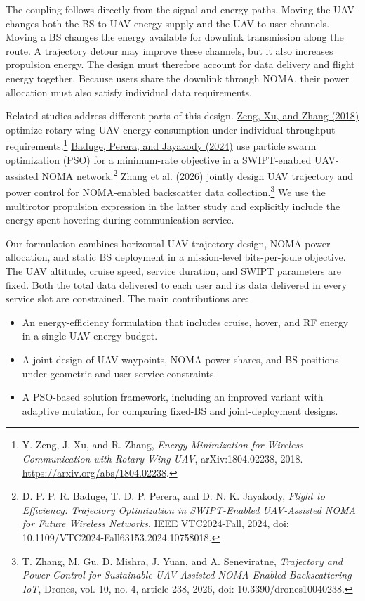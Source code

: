 The coupling follows directly from the signal and energy paths. Moving the UAV changes both the BS-to-UAV energy supply and the UAV-to-user channels. Moving a BS changes the energy available for downlink transmission along the route. A trajectory detour may improve these channels, but it also increases propulsion energy. The design must therefore account for data delivery and flight energy together. Because users share the downlink through NOMA, their power allocation must also satisfy individual data requirements.

Related studies address different parts of this design. \href{https://arxiv.org/abs/1804.02238}{Zeng, Xu, and Zhang (2018)} optimize rotary-wing UAV energy consumption under individual throughput requirements.\footnote{Y. Zeng, J. Xu, and R. Zhang, \emph{Energy Minimization for Wireless Communication with Rotary-Wing UAV}, arXiv:1804.02238, 2018. \url{https://arxiv.org/abs/1804.02238}.} \href{https://doi.org/10.1109/VTC2024-Fall63153.2024.10758018}{Baduge, Perera, and Jayakody (2024)} use particle swarm optimization (PSO) for a minimum-rate objective in a SWIPT-enabled UAV-assisted NOMA network.\footnote{D. P. P. R. Baduge, T. D. P. Perera, and D. N. K. Jayakody, \emph{Flight to Efficiency: Trajectory Optimization in SWIPT-Enabled UAV-Assisted NOMA for Future Wireless Networks}, IEEE VTC2024-Fall, 2024, doi: 10.1109/VTC2024-Fall63153.2024.10758018.} \href{https://doi.org/10.3390/drones10040238}{Zhang et al. (2026)} jointly design UAV trajectory and power control for NOMA-enabled backscatter data collection.\footnote{T. Zhang, M. Gu, D. Mishra, J. Yuan, and A. Seneviratne, \emph{Trajectory and Power Control for Sustainable UAV-Assisted NOMA-Enabled Backscattering IoT}, Drones, vol. 10, no. 4, article 238, 2026, doi: 10.3390/drones10040238.} We use the multirotor propulsion expression in the latter study and explicitly include the energy spent hovering during communication service.

Our formulation combines horizontal UAV trajectory design, NOMA power allocation, and static BS deployment in a mission-level bits-per-joule objective. The UAV altitude, cruise speed, service duration, and SWIPT parameters are fixed. Both the total data delivered to each user and its data delivered in every service slot are constrained. The main contributions are:
\begin{itemize}
\item An energy-efficiency formulation that includes cruise, hover, and RF energy in a single UAV energy budget.
\item A joint design of UAV waypoints, NOMA power shares, and BS positions under geometric and user-service constraints.
\item A PSO-based solution framework, including an improved variant with adaptive mutation, for comparing fixed-BS and joint-deployment designs.
\end{itemize}

